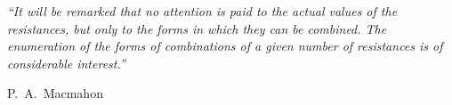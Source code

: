 

\epigraph{\textit{``It will be remarked that no attention is paid to the actual values of the resistances, but only to the forms in which they can be combined. The enumeration of the forms of combinations of a given number of resistances is of considerable interest.''}}{\textmd{P.~A.~Macmahon} \cite{Macmahon1994a}}









